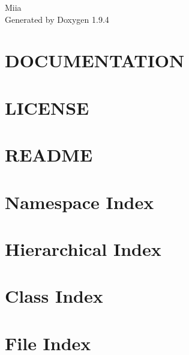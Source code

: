 \documentclass[twoside]{book}
\newcommand{\+}{\discretionary{\mbox{\scriptsize$\hookleftarrow$}}{}{}}
\newcommand{\clearemptydoublepage}{%
    \newpage{\pagestyle{empty}\cleardoublepage}%
  }
\begin{document}
  \raggedbottom
    \hypersetup{pageanchor=false,
                bookmarksnumbered=true,
                pdfencoding=unicode
               }
  \begin{titlepage}
  \vspace*{7cm}
  \begin{center}%
  {\Large Miia}\\
  \vspace*{1cm}
  {\large Generated by Doxygen 1.9.4}\\
  \end{center}
  \end{titlepage}
  \clearemptydoublepage
  \tableofcontents
  \clearemptydoublepage
  \hypersetup{pageanchor=true}
\chapter{DOCUMENTATION}
\label{md_DOCUMENTATION}

\chapter{LICENSE}
\label{md_Miia_packages_Newtonsoft_Json_13_0_1_LICENSE}

\chapter{README}
\label{md_README}

\chapter{Namespace Index}

\chapter{Hierarchical Index}

\chapter{Class Index}

\chapter{File Index}

\end{document}
